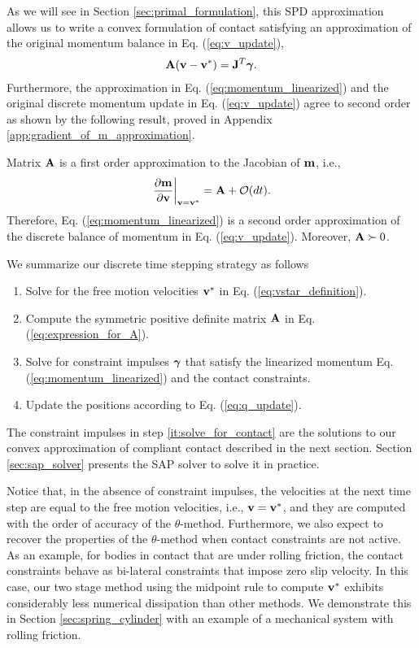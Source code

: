 As we will see in Section \ref{sec:primal_formulation}, this SPD approximation
allows us to write a convex formulation of contact satisfying an approximation
of the original momentum balance in Eq. (\ref{eq:v_update}),
\begin{align}
	\mf{A}(\mf{v}-\mf{v}^*) = \mf{J}^T\mf{\bgamma}.
	\label{eq:momentum_linearized}
\end{align}
Furthermore, the approximation in Eq. (\ref{eq:momentum_linearized}) and the
original discrete momentum update in Eq. (\ref{eq:v_update}) agree to second
order as shown by the following result, proved in Appendix
\ref{app:gradient_of_m_approximation}.
\begin{prop}	
Matrix ${\mathbf{A}}$ is a first order approximation to the Jacobian of ${\mathbf{m}}$,
i.e.,
\begin{align}
	\left. \frac{\partial {\mathbf{m}}}{\partial {\mathbf{v}}} \right|_{{\mathbf{v}}={\mathbf{v}}^*} = {\mathbf{A}} + \mathcal{O}(dt).
\end{align}
Therefore, Eq. (\ref{eq:momentum_linearized}) is a second order approximation of
the discrete balance of momentum in Eq. (\ref{eq:v_update}). Moreover, ${\mathbf{A}}
\succ 0$.
\label{prop:gradient_of_m_approximation}
\end{prop}

We summarize our discrete time stepping strategy as follows
\begin{enumerate}
	\item Solve for the free motion velocities ${\mathbf{v}}^*$ in Eq.
	(\ref{eq:vstar_definition}).
	\item Compute the symmetric positive definite matrix ${\mathbf{A}}$ in Eq.
	(\ref{eq:expression_for_A}).
	\item\label{it:solve_for_contact} Solve for constraint impulses ${\bm\gamma}$
	that satisfy the linearized momentum Eq. (\ref{eq:momentum_linearized}) and
	the contact constraints. 
	\item Update the positions according to Eq. (\ref{eq:q_update}).
\end{enumerate}

The constraint impulses in step \ref{it:solve_for_contact} are the solutions to
our convex approximation of compliant contact described in the next section.
Section \ref{sec:sap_solver} presents the SAP solver to solve it in practice.


Notice that, in the absence of constraint impulses, the velocities at the next
time step are equal to the free motion velocities, i.e., ${\mathbf{v}}={\mathbf{v}}^*$, and
they are computed with the order of accuracy of the $\theta\text{-method}$.
Furthermore, we also expect to recover the properties of the
$\theta\text{-method}$ when contact constraints are not active. As an example,
for bodies in contact that are under rolling friction,
the contact constraints behave as bi-lateral constraints that impose zero slip
velocity. In this case, our two stage method using the midpoint rule to compute
${\mathbf{v}}^*$ exhibits considerably less numerical dissipation than other methods.
We demonstrate this in Section \ref{sec:spring_cylinder} with an example of a
mechanical system with rolling friction.

